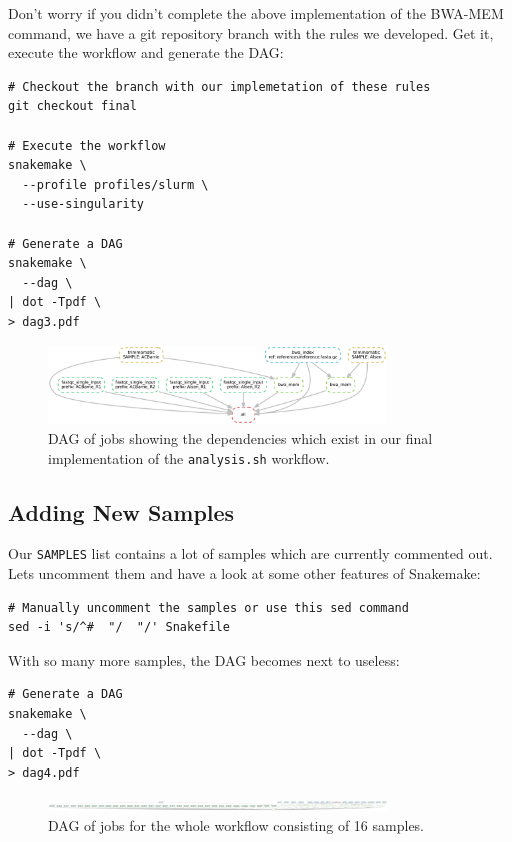 Don't worry if you didn't complete the above implementation of the BWA-MEM command, we have a git repository branch with
the rules we developed. Get it, execute the workflow and generate the DAG:

\begin{lstlisting}
# Checkout the branch with our implemetation of these rules
git checkout final

# Execute the workflow
snakemake \
  --profile profiles/slurm \
  --use-singularity

# Generate a DAG
snakemake \
  --dag \
| dot -Tpdf \
> dag3.pdf
\end{lstlisting}

\begin{figure}[H]
\centering
\includegraphics[width=0.8\textwidth]{handout/dag3.pdf}
\caption{DAG of jobs showing the dependencies which exist in our final implementation of the \texttt{analysis.sh} workflow.}
\label{fig:dag3}
\end{figure}

\subsection{Adding New Samples}

Our \texttt{SAMPLES} list contains a lot of samples which are currently commented out. Lets uncomment them and have a look
at some other features of Snakemake:

\begin{lstlisting}
# Manually uncomment the samples or use this sed command
sed -i 's/^#  "/  "/' Snakefile
\end{lstlisting}

With so many more samples, the DAG becomes next to useless:

\begin{lstlisting}
# Generate a DAG
snakemake \
  --dag \
| dot -Tpdf \
> dag4.pdf
\end{lstlisting}

\begin{figure}[H]
\centering
\includegraphics[width=0.8\textwidth]{handout/dag4.pdf}
\caption{DAG of jobs for the whole workflow consisting of 16 samples.}
\label{fig:dag4}
\end{figure}

